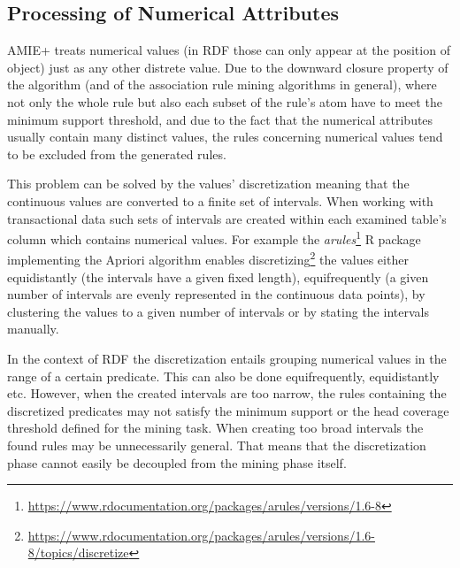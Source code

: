 

\subsection{Processing of Numerical Attributes\label{numericalattributes}}

AMIE+ treats numerical values (in RDF those can only appear at the position of object) just as any other distrete value. Due to the downward closure property of the algorithm (and of the association rule mining algorithms in general), where not only the whole rule but also each subset of the rule's atom have to meet the minimum support threshold, and due to the fact that the numerical attributes usually contain many distinct values, the rules concerning numerical values tend to be excluded from the generated rules.

This problem can be solved by the values' discretization meaning that the continuous values are converted to a finite set of intervals. When working with transactional data such sets of intervals are created within each examined table's column which contains numerical values. For example the \textit{arules}\footnote{\href{https://www.rdocumentation.org/packages/arules/versions/1.6-8}{https://www.rdocumentation.org/packages/arules/versions/1.6-8}} R package implementing the Apriori algorithm enables discretizing\footnote{\href{https://www.rdocumentation.org/packages/arules/versions/1.6-8/topics/discretize}{https://www.rdocumentation.org/packages/arules/versions/1.6-8/topics/discretize}} the values either equidistantly (the intervals have a given fixed length), equifrequently (a given number of intervals are evenly represented in the continuous data points), by clustering the values to a given number of intervals or by stating the intervals manually.

In the context of RDF the discretization entails grouping numerical values in the range of a certain predicate. This can also be done equifrequently, equidistantly etc. However, when the created intervals are too narrow, the rules containing the discretized predicates may not satisfy the minimum support or the head coverage threshold defined for the mining task. When creating too broad intervals the found rules may be unnecessarily general. That means that the discretization phase cannot easily be decoupled from the mining phase itself.

